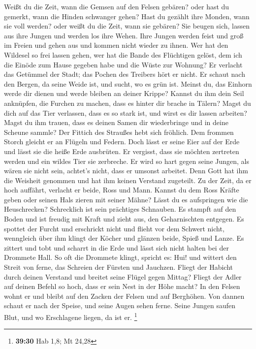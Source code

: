  Weißt du die Zeit, wann die Gemsen auf den Felsen
gebären? oder hast du gemerkt, wann die Hinden schwanger gehen?
 Hast du gezählt ihre Monden, wann sie voll werden? oder
weißt du die Zeit, wann sie gebären?  Sie beugen sich,
lassen aus ihre Jungen und werden los ihre Wehen.  Ihre
Jungen werden feist und groß im Freien und gehen aus und kommen nicht
wieder zu ihnen.  Wer hat den Wildesel so frei lassen
gehen, wer hat die Bande des Flüchtigen gelöst,  dem ich
die Einöde zum Hause gegeben habe und die Wüste zur Wohnung?
 Er verlacht das Getümmel der Stadt; das Pochen des
Treibers hört er nicht.  Er schaut nach den Bergen, da
seine Weide ist, und sucht, wo es grün ist.  Meinst du,
das Einhorn werde dir dienen und werde bleiben an deiner Krippe?
 Kannst du ihm dein Seil anknüpfen, die Furchen zu
machen, dass es hinter dir brache in Tälern?  Magst du
dich auf das Tier verlassen, dass es so stark ist, und wirst es dir
lassen arbeiten?  Magst du ihm trauen, dass es deinen
Samen dir wiederbringe und in deine Scheune sammle?  Der
Fittich des Straußes hebt sich fröhlich. Dem frommen Storch gleicht er
an Flügeln und Federn.  Doch lässt er seine Eier auf der
Erde und lässt sie die heiße Erde ausbrüten.  Er
vergisst, dass sie möchten zertreten werden und ein wildes Tier sie
zerbreche.  Er wird so hart gegen seine Jungen, als wären
sie nicht sein, achtet's nicht, dass er umsonst arbeitet.
 Denn Gott hat ihm die Weisheit genommen und hat ihm
keinen Verstand zugeteilt.  Zu der Zeit, da er hoch
auffährt, verlacht er beide, Ross und Mann.  Kannst du
dem Ross Kräfte geben oder seinen Hals zieren mit seiner Mähne?
 Lässt du es aufspringen wie die Heuschrecken?
Schrecklich ist sein prächtiges Schnauben.  Es stampft
auf den Boden und ist freudig mit Kraft und zieht aus, den Geharnischten
entgegen.  Es spottet der Furcht und erschrickt nicht und
flieht vor dem Schwert nicht,  wenngleich über ihm klingt
der Köcher und glänzen beide, Spieß und Lanze.  Es
zittert und tobt und scharrt in die Erde und lässt sich nicht halten bei
der Drommete Hall.  So oft die Drommete klingt, spricht
es: Hui! und wittert den Streit von ferne, das Schreien der Fürsten und
Jauchzen.  Fliegt der Habicht durch deinen Verstand und
breitet seine Flügel gegen Mittag?  Fliegt der Adler auf
deinen Befehl so hoch, dass er sein Nest in der Höhe macht?
 In den Felsen wohnt er und bleibt auf den Zacken der
Felsen und auf Berghöhen.  Von dannen schaut er nach der
Speise, und seine Augen sehen ferne.  Seine Jungen saufen
Blut, und wo Erschlagene liegen, da ist er. \footnote{\textbf{39:30} Hab
  1,8; Mt 24,28}

